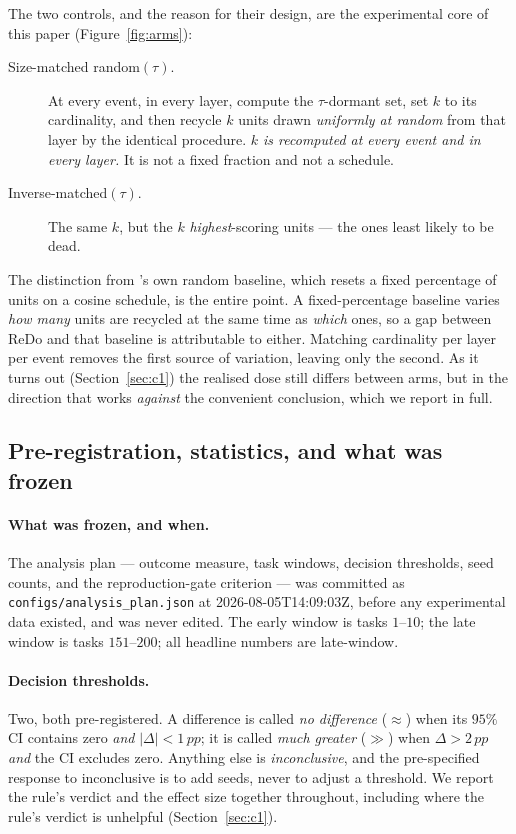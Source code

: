 \documentclass[10pt]{article}
\newcommand{\pp}{\,pp}
\begin{document}
The two controls, and the reason for their design, are the experimental core of
this paper (Figure~\ref{fig:arms}):

\begin{description}
\item[Size-matched random$(\tau)$.] At every event, in every layer, compute the
$\tau$-dormant set, set $k$ to its cardinality, and then recycle $k$ units drawn
\emph{uniformly at random} from that layer by the identical procedure. \emph{$k$
is recomputed at every event and in every layer.} It is not a fixed fraction and
not a schedule.

\item[Inverse-matched$(\tau)$.] The same $k$, but the $k$ \emph{highest}-scoring
units --- the ones least likely to be dead.
\end{description}

The distinction from \citeauthor{sokar2023dormant}'s own random baseline, which
resets a fixed percentage of units on a cosine schedule, is the entire point. A
fixed-percentage baseline varies \emph{how many} units are recycled at the same
time as \emph{which} ones, so a gap between ReDo and that baseline is
attributable to either. Matching cardinality per layer per event removes the
first source of variation, leaving only the second. As it turns out
(Section~\ref{sec:c1}) the realised dose still differs between arms, but in the
direction that works \emph{against} the convenient conclusion, which we report
in full.

\subsection{Pre-registration, statistics, and what was frozen}

\paragraph{What was frozen, and when.} The analysis plan --- outcome measure,
task windows, decision thresholds, seed counts, and the reproduction-gate
criterion --- was committed as \texttt{configs/analysis\_plan.json} at
2026-08-05T14:09:03Z, before any experimental data existed, and was never
edited. The early window is tasks $1$--$10$; the late window is tasks
$151$--$200$; all headline numbers are late-window.

\paragraph{Decision thresholds.} Two, both pre-registered. A difference is
called \emph{no difference} ($\approx$) when its $95\%$ CI contains zero
\emph{and} $|\Delta| < 1\pp$; it is called \emph{much greater} ($\gg$) when
$\Delta > 2\pp$ \emph{and} the CI excludes zero. Anything else is
\emph{inconclusive}, and the pre-specified response to inconclusive is to add
seeds, never to adjust a threshold. We report the rule's verdict and the effect
size together throughout, including where the rule's verdict is unhelpful
(Section~\ref{sec:c1}).
\end{document}
